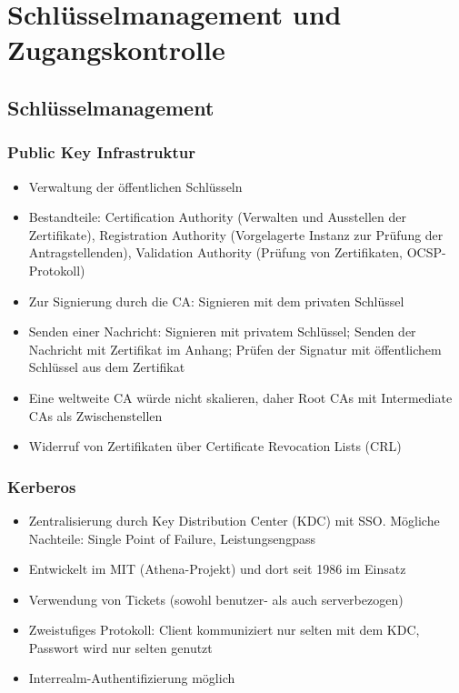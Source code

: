 \section{Schlüsselmanagement und Zugangskontrolle}

\subsection{Schlüsselmanagement}

\subsubsection{Public Key Infrastruktur}
\begin{itemize}
	\item Verwaltung der öffentlichen Schlüsseln
	\item Bestandteile: Certification Authority (Verwalten und Ausstellen der Zertifikate), Registration Authority (Vorgelagerte Instanz zur Prüfung der Antragstellenden), Validation Authority (Prüfung von Zertifikaten, OCSP-Protokoll)
	\item Zur Signierung durch die CA: Signieren mit dem privaten Schlüssel
	\item Senden einer Nachricht: Signieren mit privatem Schlüssel; Senden der Nachricht mit Zertifikat im Anhang; Prüfen der Signatur mit öffentlichem Schlüssel aus dem Zertifikat
	\item Eine weltweite CA würde nicht skalieren, daher Root CAs mit Intermediate CAs als Zwischenstellen
	\item Widerruf von Zertifikaten über Certificate Revocation Lists (CRL)
\end{itemize}

\subsubsection{Kerberos}
\begin{itemize}
	\item Zentralisierung durch Key Distribution Center (KDC) mit SSO. Mögliche Nachteile: Single Point of Failure, Leistungsengpass
	\item Entwickelt im MIT (Athena-Projekt) und dort seit 1986 im Einsatz
	\item Verwendung von Tickets (sowohl benutzer- als auch serverbezogen)
	\item Zweistufiges Protokoll: Client kommuniziert nur selten mit dem KDC, Passwort wird nur selten genutzt
	\item Interrealm-Authentifizierung möglich
\end{itemize}



